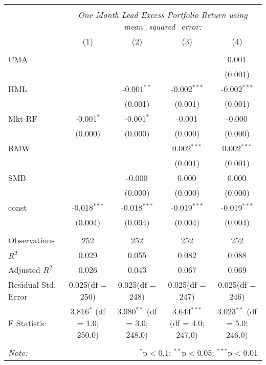 \begin{table}[!htbp] \centering
\begin{tabular}{@{\extracolsep{5pt}}lcccc}
\\[-1.8ex]\hline
\hline \\[-1.8ex]
& \multicolumn{4}{c}{\textit{One Month Lead Excess Portfolio Return using mean_squared_error:}} \
\cr \cline{4-5}
\\[-1.8ex] & (1) & (2) & (3) & (4) \\
\hline \\[-1.8ex]
 CMA & & & & 0.001$^{}$ \\
  & & & & (0.001) \\
 HML & & -0.001$^{**}$ & -0.002$^{***}$ & -0.002$^{***}$ \\
  & & (0.001) & (0.001) & (0.001) \\
 Mkt-RF & -0.001$^{*}$ & -0.001$^{*}$ & -0.001$^{}$ & -0.000$^{}$ \\
  & (0.000) & (0.000) & (0.000) & (0.000) \\
 RMW & & & 0.002$^{***}$ & 0.002$^{***}$ \\
  & & & (0.001) & (0.001) \\
 SMB & & -0.000$^{}$ & 0.000$^{}$ & 0.000$^{}$ \\
  & & (0.000) & (0.000) & (0.000) \\
 const & -0.018$^{***}$ & -0.018$^{***}$ & -0.019$^{***}$ & -0.019$^{***}$ \\
  & (0.004) & (0.004) & (0.004) & (0.004) \\
\hline \\[-1.8ex]
 Observations & 252 & 252 & 252 & 252 \\
 $R^2$ & 0.029 & 0.055 & 0.082 & 0.088 \\
 Adjusted $R^2$ & 0.026 & 0.043 & 0.067 & 0.069 \\
 Residual Std. Error & 0.025(df = 250) & 0.025(df = 248) & 0.025(df = 247) & 0.025(df = 246)  \\
 F Statistic & 3.816$^{*}$ (df = 1.0; 250.0) & 3.080$^{**}$ (df = 3.0; 248.0) & 3.644$^{***}$ (df = 4.0; 247.0) & 3.023$^{**}$ (df = 5.0; 246.0) \\
\hline
\hline \\[-1.8ex]
\textit{Note:} & \multicolumn{4}{r}{$^{*}$p$<$0.1; $^{**}$p$<$0.05; $^{***}$p$<$0.01} \\
\end{tabular}
\end{table}
